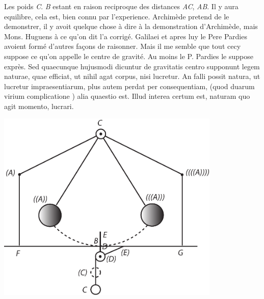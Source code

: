                     \noindent Les poids \textit{C}. \textit{B} estant en raison reciproque des distances   \textit{AC}, \textit{AB}. Il y aura equilibre, cela est,   bien connu par l'experience. Archim\`{e}de\protect{} pretend de le demonstrer, il y avoit quelque chose \`{a} dire \`{a} la demonstration d'Archim\`{e}de\protect{}, mais Mons. Huguens\protect{}  \`{a} ce qu'on dit l'a corrig\'{e}. Galilaei\protect{} et apres luy le Pere Pardies\protect{} avoient form\'{e} d'autres fa\c{c}ons   de raisonner. Mais il me semble que tout cecy suppose ce qu'on appelle le centre de gravit\'{e}.   Au moins le P. Pardies\protect{} le suppose expr\`{e}s.  Sed quaecunque hujusmodi dicuntur de gravitatis centro supponunt legem naturae, quae efficiat, ut nihil agat  corpus, nisi lucretur. An falli possit natura, ut lucretur impraesentiarum,   plus autem perdat per consequentiam, (quod duarum virium complicatione ) alia quaestio est. Illud interea certum est, naturam   quo agit momento, lucrari.  \pend \pstart   \begin{center}                    
                \includegraphics[width=0.8\textwidth]{images/lh03705126r-2}
              
                        \end{center}
